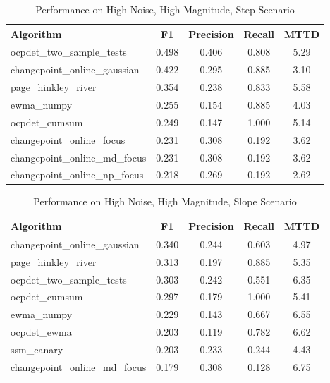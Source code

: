 \documentclass[journal,article,submit,pdftex,moreauthors]{Definitions/mdpi}
\begin{document}
\begin{table}[H]
\centering
\caption{Performance on High Noise, High Magnitude, Step Scenario}
\label{tab:scenario_alto_alto_escalon}
\small
\begin{tabular}{lcccc}
\toprule
\textbf{Algorithm} & \textbf{F1} & \textbf{Precision} & \textbf{Recall} & \textbf{MTTD} \\
\midrule
ocpdet\_two\_sample\_tests & 0.498 & 0.406 & 0.808 & 5.29 \\
changepoint\_online\_gaussian & 0.422 & 0.295 & 0.885 & 3.10 \\
page\_hinkley\_river & 0.354 & 0.238 & 0.833 & 5.58 \\
ewma\_numpy & 0.255 & 0.154 & 0.885 & 4.03 \\
ocpdet\_cumsum & 0.249 & 0.147 & 1.000 & 5.14 \\
changepoint\_online\_focus & 0.231 & 0.308 & 0.192 & 3.62 \\
changepoint\_online\_md\_focus & 0.231 & 0.308 & 0.192 & 3.62 \\
changepoint\_online\_np\_focus & 0.218 & 0.269 & 0.192 & 2.62 \\
\bottomrule
\end{tabular}
\end{table}

\begin{table}[H]
\centering
\caption{Performance on High Noise, High Magnitude, Slope Scenario}
\label{tab:scenario_alto_alto_pendiente}
\small
\begin{tabular}{lcccc}
\toprule
\textbf{Algorithm} & \textbf{F1} & \textbf{Precision} & \textbf{Recall} & \textbf{MTTD} \\
\midrule
changepoint\_online\_gaussian & 0.340 & 0.244 & 0.603 & 4.97 \\
page\_hinkley\_river & 0.313 & 0.197 & 0.885 & 5.35 \\
ocpdet\_two\_sample\_tests & 0.303 & 0.242 & 0.551 & 6.35 \\
ocpdet\_cumsum & 0.297 & 0.179 & 1.000 & 5.41 \\
ewma\_numpy & 0.229 & 0.143 & 0.667 & 6.55 \\
ocpdet\_ewma & 0.203 & 0.119 & 0.782 & 6.62 \\
ssm\_canary & 0.203 & 0.233 & 0.244 & 4.43 \\
changepoint\_online\_md\_focus & 0.179 & 0.308 & 0.128 & 6.75 \\
\bottomrule
\end{tabular}
\end{table}
\end{document}
